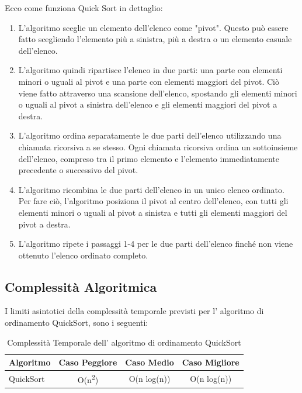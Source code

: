 \documentclass{article}
\begin{document}
			Ecco come funziona Quick Sort in dettaglio:
			\begin{enumerate}
				\item L'algoritmo sceglie un elemento dell'elenco come "pivot". Questo può essere fatto scegliendo l'elemento più a sinistra, più a destra o un elemento casuale dell'elenco.
				
				\item L'algoritmo quindi ripartisce l'elenco in due parti: una parte con elementi minori o uguali al pivot e una parte con elementi maggiori del pivot. Ciò viene fatto attraverso una scansione dell'elenco, spostando gli elementi minori o uguali al pivot a sinistra dell'elenco e gli elementi maggiori del pivot a destra.
				
				\item L'algoritmo ordina separatamente le due parti dell'elenco utilizzando una chiamata ricorsiva a se stesso. Ogni chiamata ricorsiva ordina un sottoinsieme dell'elenco, compreso tra il primo elemento e l'elemento immediatamente precedente o successivo del pivot.
				
				\item L'algoritmo ricombina le due parti dell'elenco in un unico elenco ordinato. Per fare ciò, l'algoritmo posiziona il pivot al centro dell'elenco, con tutti gli elementi minori o uguali al pivot a sinistra e tutti gli elementi maggiori del pivot a destra.
				
				\item L'algoritmo ripete i passaggi 1-4 per le due parti dell'elenco finché non viene ottenuto l'elenco ordinato completo.
			\end{enumerate}
		
		\subsection{Complessità Algoritmica}
			I limiti asintotici della complessità temporale previsti per l' algoritmo di ordinamento QuickSort, sono i seguenti:
			
			\begin{table}[ht]
				\centering
				\begin{tabular}{|l|ccc|}
					\rowcolor[HTML]{C0C0C0}
					\hline
					Algoritmo    		& Caso Peggiore & Caso Medio & Caso Migliore \\
					\hline
					QuickSort       	& O(n\textsuperscript{2})          & O(n log(n))    & O(n log(n))          \\
					\hline
				\end{tabular}
				\caption{Complessità Temporale dell' algoritmo di ordinamento QuickSort}
			\end{table}
\end{document}
